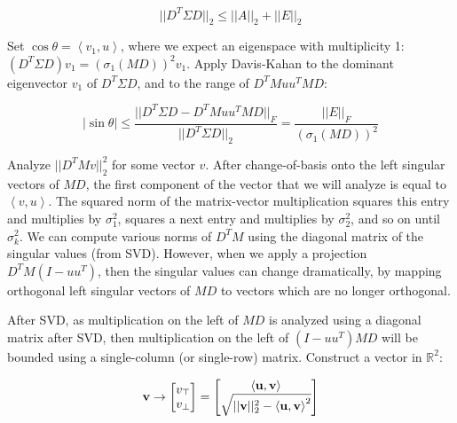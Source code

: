 \documentclass{article}
\def\tang{\ThisStyle{\abovebaseline[0pt]{\scalebox{-1}{$\SavedStyle\perp$}}}}
\begin{document}
$$
||D^T \Sigma D||_2 \le ||A||_2 + ||E||_2
$$

Set $\cos\theta = \left< v_1, u \right>$, where we expect an eigenspace with multiplicity 1: $(D^T \Sigma D) v_1 = (\sigma_1(MD))^2 v_1$. Apply Davis-Kahan to the dominant eigenvector $v_1$ of $D^T \Sigma D$, and to the range of $D^TM uu^T MD$:

$$
|\sin\theta| \le \frac{||D^T \Sigma D - D^T M u u^T M D||_F}{||D^T \Sigma D||_2} = \frac{||E||_F}{(\sigma_1(MD))^2}
$$

Analyze $||D^TM v||_2^2$ for some vector $v$. After change-of-basis onto the left singular vectors of $MD$, the first component of the vector that we will analyze is equal to $\left< v, u \right>$. The squared norm of the matrix-vector multiplication squares this entry and multiplies by $\sigma_1^2$, squares a next entry and multiplies by $\sigma_2^2$, and so on until $\sigma_k^2$. We can compute various norms of $D^TM$ using the diagonal matrix of the singular values (from SVD). However, when we apply a projection $D^TM(I-uu^T)$, then the singular values can change dramatically, by mapping orthogonal left singular vectors of $MD$ to vectors which are no longer orthogonal.

After SVD, as multiplication on the left of $MD$ is analyzed using a diagonal matrix after SVD, then multiplication on the left of $(I-uu^T)MD$ will be bounded using a single-column (or single-row) matrix. Construct a vector in $\mathbb{R}^2$:

$$\mathbf{v} \to \left[
    \begin{matrix}
        v_{\tang} \\ v_\perp
    \end{matrix}
\right]
=\left[
    \begin{matrix}
        \left<\mathbf{u},\mathbf{v}\right>
        \\
        \sqrt{||\mathbf{v}||_2^2 -
        \left<\mathbf{u},\mathbf{v}\right>^2}
    \end{matrix}
\right]
$$
\end{document}
